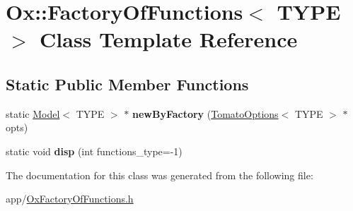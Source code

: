 \hypertarget{class_ox_1_1_factory_of_functions}{\section{Ox\-:\-:Factory\-Of\-Functions$<$ T\-Y\-P\-E $>$ Class Template Reference}
\label{class_ox_1_1_factory_of_functions}
}
\subsection*{Static Public Member Functions}
\begin{DoxyCompactItemize}
\item 
\hypertarget{class_ox_1_1_factory_of_functions_a341c4043be5e86fbc10b51be9c837859}{static \hyperlink{class_ox_1_1_model}{Model}$<$ T\-Y\-P\-E $>$ $\ast$ {\bfseries new\-By\-Factory} (\hyperlink{struct_ox_1_1_tomato_options}{Tomato\-Options}$<$ T\-Y\-P\-E $>$ $\ast$opts)}\label{class_ox_1_1_factory_of_functions_a341c4043be5e86fbc10b51be9c837859}

\item 
\hypertarget{class_ox_1_1_factory_of_functions_aa723d7a59c0bfc42d25f5599bb36cd33}{static void {\bfseries disp} (int functions\-\_\-type=-\/1)}\label{class_ox_1_1_factory_of_functions_aa723d7a59c0bfc42d25f5599bb36cd33}

\end{DoxyCompactItemize}


The documentation for this class was generated from the following file\-:\begin{DoxyCompactItemize}
\item 
app/\hyperlink{_ox_factory_of_functions_8h}{Ox\-Factory\-Of\-Functions.\-h}\end{DoxyCompactItemize}

